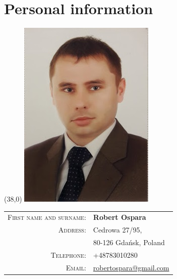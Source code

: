 \documentclass[a4paper,12pt]{article}
\begin{document}
\mbox{}
\par{\bigskip\par}

\section{Personal information}
\begin{textblock}{1}(38,0)
\includegraphics[scale=0.3]{me2.jpg}
\end{textblock}

\begin{tabular}{rl}
	\textsc{First name and surname:}&  \textbf{Robert Ospara} \\
	\textsc{Address:}& Cedrowa 27/95, \\
	\textsc{}& 80-126 Gdańsk, Poland \\
	\textsc{Telephone:}& +48783010280 \\
	\textsc{Email:}& \href{mailto:robertospara@gmail.com}{robertospara@gmail.com}
\end{tabular}

\vspace{2em}

\end{document}
